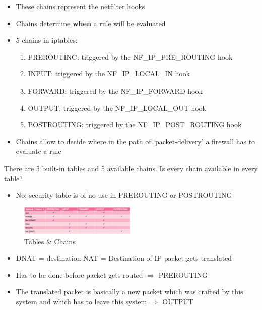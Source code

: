 \documentclass{article}
\begin{document}
\begin{itemize}
    \item These chains represent the netfilter hooks
    \item Chains determine \textbf{when} a rule will be evaluated
    \item 5 chains in iptables:
    \begin{enumerate}
        \item PREROUTING: triggered by the NF\_IP\_PRE\_ROUTING hook
        \item INPUT: triggered by the NF\_IP\_LOCAL\_IN hook
        \item FORWARD: triggered by the NF\_IP\_FORWARD hook
        \item OUTPUT: triggered by the NF\_IP\_LOCAL\_OUT hook
        \item POSTROUTING: triggered by the NF\_IP\_POST\_ROUTING hook
    \end{enumerate}
    \item Chains allow to decide where in the path of `packet-delivery' a firewall has to evaluate a rule
\end{itemize}

There are 5 built-in tables and 5 available chains.
Is every chain available in every table?

\begin{itemize}
    \item No: security table is of no use in PREROUTING or POSTROUTING  
\end{itemize}

\begin{figure}[H]
    \centering
    \includegraphics[width=0.5\textwidth]{iptables-tables-and-chains.png}
    \caption{Tables \& Chains}
\end{figure}

\begin{itemize}
    \item DNAT = destination NAT = Destination of IP packet gets translated
    \item Has to be done before packet gets routed $\Rightarrow$ PREROUTING
    \item The translated packet is basically a new packet which was crafted by this system and which has to leave this system $\Rightarrow$ OUTPUT
\end{itemize}
\end{document}
